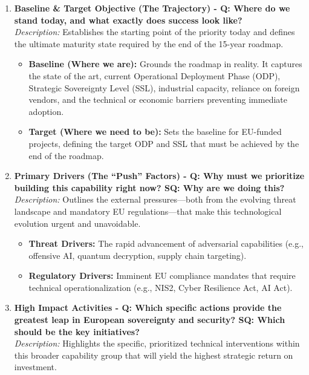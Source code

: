 \documentclass[12pt,a4paper]{article}
\begin{document}
\begin{enumerate}
    \item \textbf{Baseline \& Target Objective (The Trajectory) - Q: Where do we stand today, and what exactly does success look like?}\\
    \textit{Description:} Establishes the starting point of the priority today and defines the ultimate maturity state required by the end of the 15-year roadmap.
    \begin{itemize}
    \item \textbf{Baseline (Where we are):} Grounds the roadmap in reality. It captures the state of the art, current Operational Deployment Phase (ODP), Strategic Sovereignty Level (SSL), industrial capacity, reliance on foreign vendors, and the technical or economic barriers preventing immediate adoption.
    \item \textbf{Target (Where we need to be):} Sets the baseline for EU-funded projects, defining the target ODP and SSL that must be achieved by the end of the roadmap.
\end{itemize}
    
    \item \textbf{Primary Drivers (The ``Push'' Factors) - Q: Why must we prioritize building this capability right now? SQ: Why are we doing this?}\\
    \textit{Description:} Outlines the external pressures---both from the evolving threat landscape and mandatory EU regulations---that make this technological evolution urgent and unavoidable.
    \begin{itemize}
        \item \textbf{Threat Drivers:} The rapid advancement of adversarial capabilities (e.g., offensive AI, quantum decryption, supply chain targeting).
        \item \textbf{Regulatory Drivers:} Imminent EU compliance mandates that require technical operationalization (e.g., NIS2, Cyber Resilience Act, AI Act).
    \end{itemize}

    \item \textbf{High Impact Activities - Q: Which specific actions provide the greatest leap in European sovereignty and security? SQ: Which should be the key initiatives?}\\
    \textit{Description:} Highlights the specific, prioritized technical interventions within this broader capability group that will yield the highest strategic return on investment.


\end{enumerate}
\end{document}
